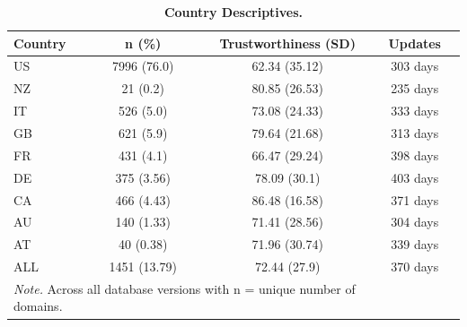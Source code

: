 \begin{table}[H]
\centering
\caption{\textbf{Country Descriptives.}}
\label{table:table2}
\begin{tabularx}{\textwidth}{ X c c c c }
\toprule
Country &       n (\%) & Trustworthiness (SD) &  Updates \\
\midrule
     US &  7996 (76.0) &        62.34 (35.12) & 303 days \\
     NZ &     21 (0.2) &        80.85 (26.53) & 235 days \\
     IT &    526 (5.0) &        73.08 (24.33) & 333 days \\
     GB &    621 (5.9) &        79.64 (21.68) & 313 days \\
     FR &    431 (4.1) &        66.47 (29.24) & 398 days \\
     DE &   375 (3.56) &         78.09 (30.1) & 403 days \\
     CA &   466 (4.43) &        86.48 (16.58) & 371 days \\
     AU &   140 (1.33) &        71.41 (28.56) & 304 days \\
     AT &    40 (0.38) &        71.96 (30.74) & 339 days \\
    ALL & 1451 (13.79) &         72.44 (27.9) & 370 days \\
\bottomrule
\multicolumn{3}{l}{\textit{Note.} Across all database versions with n = unique number of domains.}
\end{tabularx}
\end{table}
